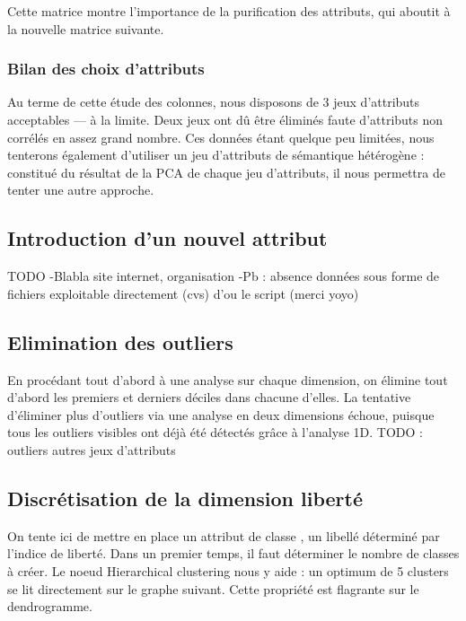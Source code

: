 Cette matrice montre l'importance de la purification des attributs, qui aboutit à la nouvelle matrice suivante.

\subsubsection{Bilan des choix d'attributs}
Au terme de cette étude des colonnes, nous disposons de 3 jeux d'attributs acceptables --- à la limite. Deux jeux ont dû être éliminés faute d'attributs non corrélés en assez grand nombre. Ces données étant quelque peu limitées, nous tenterons également d'utiliser un jeu d'attributs de sémantique hétérogène : constitué du résultat de la PCA de chaque jeu d'attributs, il nous permettra de tenter une autre approche.

\subsection{Introduction d'un nouvel attribut}
{\huge TODO}
-Blabla site internet, organisation
-Pb : absence données sous forme de fichiers exploitable directement (cvs) d'ou le script (merci yoyo)

\subsection{Elimination des outliers}
En procédant tout d'abord à une analyse sur chaque dimension, on élimine tout d'abord les premiers et derniers déciles dans chacune d'elles.
La tentative d'éliminer plus d'outliers via une analyse en deux dimensions échoue, puisque tous les outliers visibles ont déjà été détectés grâce à l'analyse 1D.
{\huge TODO : outliers autres jeux d'attributs}

\subsection{Discrétisation de la dimension \og liberté \fg}
On tente ici de mettre en place un attribut de \og classe \fg, un libellé déterminé par l'indice de liberté. Dans un premier temps, il faut déterminer le nombre de classes à créer. Le noeud \og Hierarchical clustering \fg nous y aide : un optimum de 5 clusters se lit directement sur le graphe suivant.
Cette propriété est flagrante sur le dendrogramme.

